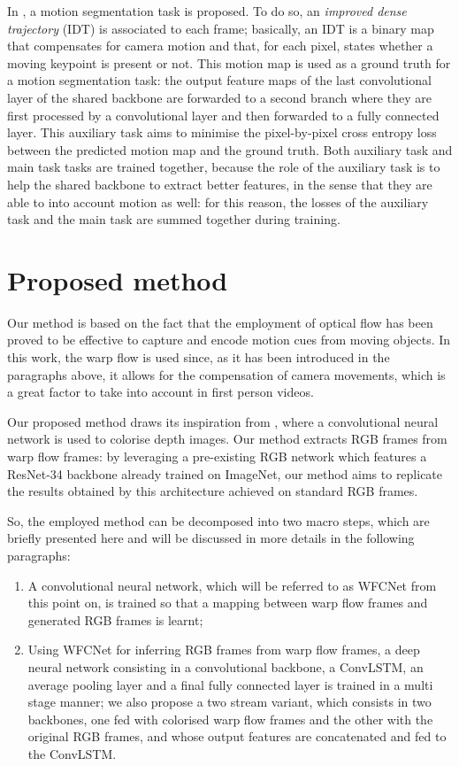 \documentclass[10pt,twocolumn,letterpaper]{article}
\begin{document}
In \cite{planamente2020joint}, a motion segmentation task is proposed. To do so, an \textit{improved dense trajectory} (IDT) is associated to each frame; basically, an IDT is a binary map that compensates for camera motion and that, for each pixel, states whether a moving keypoint is present or not. This motion map is used as a ground truth for a motion segmentation task: the output feature maps of the last convolutional layer of the shared backbone are forwarded to a second branch where they are first processed by a convolutional layer and then forwarded to a fully connected layer. This auxiliary task aims to minimise the pixel-by-pixel cross entropy loss between the predicted motion map and the ground truth. Both auxiliary task and main task tasks are trained together, because the role of the auxiliary task is to help the shared backbone to extract better features, in the sense that they are able to into account motion as well: for this reason, the losses of the auxiliary task and the main task are summed together during training.


\section{Proposed method}
Our method is based on the fact that the employment of optical flow has been proved to be effective to capture and encode motion cues from moving objects. In this work, the warp flow is used since, as it has been introduced in the paragraphs above, it allows for the compensation of camera movements, which is a great factor to take into account in first person videos.

Our proposed method draws its inspiration from \cite{carlucci2017de2}, where a convolutional neural network is used to colorise depth images. Our method extracts RGB frames from warp flow frames: by leveraging a pre-existing RGB network which features a ResNet-34 backbone already trained on ImageNet, our method aims to replicate the results obtained by this architecture achieved on standard RGB frames.

So, the employed method can be decomposed into two macro steps, which are briefly presented here and will be discussed in more details in the following paragraphs:
\begin{enumerate}
	\item A convolutional neural network, which will be referred to as WFCNet from this point on, is trained so that a mapping between warp flow frames and generated RGB frames is learnt; 
	\item Using WFCNet for inferring RGB frames from warp flow frames, a deep neural network consisting in a convolutional backbone, a ConvLSTM, an average pooling layer and a final fully connected layer is trained in a multi stage manner; we also propose a two stream variant, which consists in two backbones, one fed with colorised warp flow frames and the other with the original RGB frames, and whose output features are concatenated and fed to the ConvLSTM.
\end{enumerate}
\end{document}
